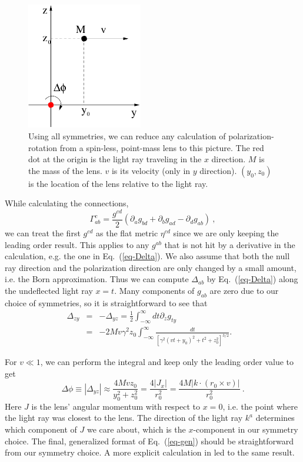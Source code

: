 \documentclass[aps,showpacs,twocolumn,floats,prd,superscriptaddress,nofootinbib]{revtex4-1}
\begin{document}
\begin{figure}
\includegraphics[width=0.45\textwidth]{rotation.pdf}
\caption{\label{fig:rotation}
Using all symmetries, we can reduce any calculation of polarization-rotation from a spin-less, point-mass lens to this picture.
The red dot at the origin is the light ray traveling in the $x$ direction.
$M$ is the mass of the lens.
$v$ is its velocity (only in $y$ direction).
$(y_0,z_0)$ is the location of the lens relative to the light ray.
}
\end{figure}

While calculating the connections,
\begin{equation}
\Gamma_{ab}^c = \frac{g^{cd}}{2}\left(\partial_a g_{bd} + \partial_b g_{ad} - \partial_d g_{ab} \right)~,
\end{equation}
we can treat the first $g^{cd}$ as the flat metric $\eta^{cd}$ since we are only keeping the leading order result. 
This applies to any $g^{ab}$ that is not hit by a derivative in the calculation, e.g. the one in Eq.~(\ref{eq-Delta}).
We also assume that both the null ray direction and the polarization direction are only changed by a small amount, i.e. the Born approximation. 
Thus we can compute $\Delta_{ab}$ by Eq.~(\ref{eq-Delta}) along the undeflected light ray $x=t$.
Many components of $g_{ab}$ are zero due to our choice of symmetries, so it is straightforward to see that
\begin{eqnarray}
\Delta_{zy} &=& -\Delta_{yz} = \frac{1}{2}\int_{-\infty}^{\infty} dt \partial_z g_{ty} \nonumber \\
&=&-2Mv\gamma^2 z_0 \int_{-\infty}^{\infty}
\frac{dt}{\left[\gamma^2(vt+y_0)^2+t^2 + z_0^2\right]^{3/2}}. ~~~~
\end{eqnarray}

For $v\ll1$, we can perform the integral and keep only the leading order value to get 
\begin{equation}
\Delta\phi \equiv |\Delta_{yz}| \approx \frac{4Mvz_0}{y_0^2 + z_0^2}
= \frac{4|J_x|}{r_0^2}
= \frac{4 M |k\cdot(r_0\times v)|}{r_0^2}~.
\label{eq-gen}
\end{equation}
Here $J$ is the lens' angular momentum with respect to $x=0$, i.e. the point where the light ray was closest to the lens.
The direction of the light ray $k^a$ determines which component of $J$ we care about, which is the $x$-component in our symmetry choice.
The final, generalized format of Eq.~(\ref{eq-gen}) should be straightforward from our symmetry choice.
A more explicit calculation in \cite{KopMas01} led to the same result.
\end{document}
